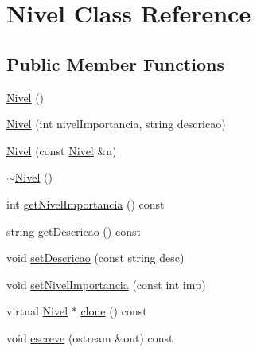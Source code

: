 \hypertarget{class_nivel}{\section{Nivel Class Reference}
\label{class_nivel}
}
\subsection*{Public Member Functions}
\begin{DoxyCompactItemize}
\item 
\hyperlink{class_nivel_a11c4739f354de3ff653af241b837e328}{Nivel} ()
\item 
\hyperlink{class_nivel_a7eb10bf2acb2071d5f653dda01d9e8f4}{Nivel} (int nivel\-Importancia, string descricao)
\item 
\hyperlink{class_nivel_a44dfb5ab3af8bba58250b28dacc78d31}{Nivel} (const \hyperlink{class_nivel}{Nivel} \&n)
\item 
\hyperlink{class_nivel_a965c3ae8442da70021de778020808286}{$\sim$\-Nivel} ()
\item 
int \hyperlink{class_nivel_a4a5618c1651358178c673f30b10b3353}{get\-Nivel\-Importancia} () const 
\item 
string \hyperlink{class_nivel_a822adf3f2f11bbd3f2d5311d6d4a4fd7}{get\-Descricao} () const 
\item 
void \hyperlink{class_nivel_aa1f6dfd07c68ed4edbbce2da115e3b52}{set\-Descricao} (const string desc)
\item 
void \hyperlink{class_nivel_aedb81567d3e914c89d51f22fbb5f5c3a}{set\-Nivel\-Importancia} (const int imp)
\item 
virtual \hyperlink{class_nivel}{Nivel} $\ast$ \hyperlink{class_nivel_a8d3d606fd4b7ba338f4d2e62c5401640}{clone} () const 
\item 
void \hyperlink{class_nivel_a58117f80580ceb6df07f1558ab64e947}{escreve} (ostream \&out) const 
\end{DoxyCompactItemize}


